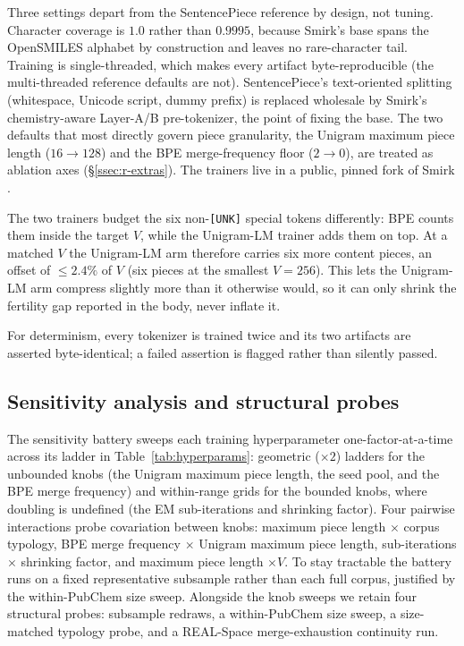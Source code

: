 \documentclass{article}
\begin{document}
Three settings depart from the SentencePiece reference by design, not tuning.
Character coverage is $1.0$ rather than $0.9995$, because Smirk's base spans
the OpenSMILES alphabet by construction and leaves no rare-character tail.
Training is single-threaded, which makes every artifact byte-reproducible (the
multi-threaded reference defaults are not). SentencePiece's text-oriented
splitting (whitespace, Unicode script, dummy prefix) is replaced wholesale by
Smirk's chemistry-aware Layer-A/B pre-tokenizer, the point of fixing the base.
The two defaults that most directly govern piece granularity, the Unigram
maximum piece length ($16 \to 128$) and the BPE merge-frequency floor
($2 \to 0$), are treated as ablation axes (\S\ref{ssec:r-extras}). The
trainers live in a public, pinned fork of Smirk \citep{smirk-vtc-fork}.

The two trainers budget the six non-\texttt{[UNK]} special tokens
differently: BPE counts them inside the target $V$, while the
Unigram-LM trainer adds them on top. At a matched $V$ the Unigram-LM arm therefore
carries six more content pieces, an offset of $\le 2.4\%$ of $V$ (six pieces at
the smallest $V{=}256$). This lets the Unigram-LM arm compress slightly more than it
otherwise would, so it can only shrink the fertility gap reported in the body,
never inflate it.

For determinism, every tokenizer is trained twice and its two artifacts are
asserted byte-identical; a failed assertion is flagged rather than silently
passed.

\subsection{Sensitivity analysis and structural probes}\label{app:sensitivity}

The sensitivity battery sweeps each training hyperparameter
one-factor-at-a-time across its ladder in Table~\ref{tab:hyperparams}:
geometric ($\times 2$) ladders for the unbounded knobs (the Unigram maximum
piece length, the seed pool, and the BPE merge frequency) and within-range
grids for the bounded knobs, where doubling is undefined (the EM
sub-iterations and shrinking factor). Four pairwise interactions probe
covariation between knobs: maximum piece length $\times$ corpus typology, BPE
merge frequency $\times$ Unigram maximum piece length, sub-iterations $\times$
shrinking factor, and maximum piece length $\times V$. To stay tractable the
battery runs on a fixed representative subsample rather than each full corpus,
justified by the within-PubChem size sweep. Alongside the knob sweeps we
retain four structural probes: subsample redraws, a within-PubChem size sweep,
a size-matched typology probe, and a REAL-Space merge-exhaustion continuity
run.
\end{document}
